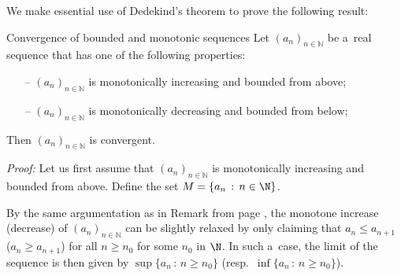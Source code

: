 We make essential use of Dedekind's theorem to prove the following result:
\begin{Theorem}{Convergence of bounded and monotonic sequences}\label{thm:monbndseq}
 Let $(a_n)_{n\in\mathbb{N}}$ be a~real sequence that has one of the following properties:
\begin{itemize}
 \item[--] $(a_n)_{n\in\mathbb{N}}$ is monotonically increasing and bounded from above;
 \item[--] $(a_n)_{n\in\mathbb{N}}$ is monotonically decreasing and bounded from below;
\end{itemize}
Then $(a_n)_{n\in\mathbb{N}}$ is convergent.
\end{Theorem}
{\em Proof:} Let us first assume that $(a_n)_{n\in\mathbb{N}}$ is monotonically increasing and bounded from above. Define the set $M=\{a_n\,:\,n\in\N\}$. 

\begin{Remark}{}\label{rem:monseqgen}
 By the same argumentation as in Remark from page \pageref{rem:n_0mon}, the monotone increase (decrease) of $(a_n)_{n\in\mathbb{N}}$ can be slightly relaxed by only claiming that $a_n\leq a_{n+1}$ ($a_n\geq a_{n+1}$) for all $n\geq n_0$ for some $n_0$ in $\N$. In such a~case, the limit of the sequence is then given by $\sup\{a_n\,:\,n\geq n_0\}$ (resp.\ $\inf\{a_n\,:\,n\geq n_0\}$).
\end{Remark}

